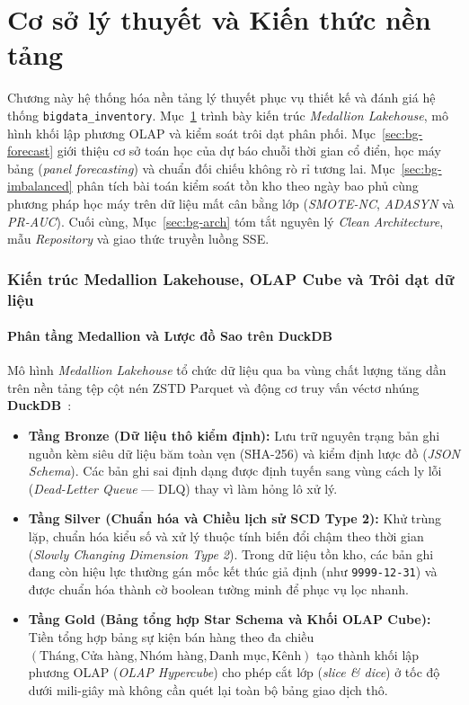 \part{Cơ sở lý thuyết và Kiến thức nền tảng}
\label{part:background}

Chương này hệ thống hóa nền tảng lý thuyết phục vụ thiết kế và đánh giá hệ thống \texttt{bigdata_inventory}. Mục~\ref{sec:bg-lakehouse} trình bày kiến trúc \textit{Medallion Lakehouse}, mô hình khối lập phương OLAP và kiểm soát trôi dạt phân phối. Mục~\ref{sec:bg-forecast} giới thiệu cơ sở toán học của dự báo chuỗi thời gian cổ điển, học máy bảng (\textit{panel forecasting}) và chuẩn đối chiếu không rò rỉ tương lai. Mục~\ref{sec:bg-imbalanced} phân tích bài toán kiểm soát tồn kho theo ngày bao phủ cùng phương pháp học máy trên dữ liệu mất cân bằng lớp (\textit{SMOTE-NC}, \textit{ADASYN} và \textit{PR-AUC}). Cuối cùng, Mục~\ref{sec:bg-arch} tóm tắt nguyên lý \textit{Clean Architecture}, mẫu \textit{Repository} và giao thức truyền luồng SSE.

\section{Kiến trúc Medallion Lakehouse, OLAP Cube và Trôi dạt dữ liệu}
\label{sec:bg-lakehouse}

\subsection{Phân tầng Medallion và Lược đồ Sao trên DuckDB}
Mô hình \textit{Medallion Lakehouse} tổ chức dữ liệu qua ba vùng chất lượng tăng dần trên nền tảng tệp cột nén ZSTD Parquet và động cơ truy vấn véctơ nhúng \textbf{DuckDB}~\cite{raasveldt2019duckdb}:
\begin{itemize}[topsep=0pt, itemsep=1pt]
	\item \textbf{Tầng Bronze (Dữ liệu thô kiểm định):} Lưu trữ nguyên trạng bản ghi nguồn kèm siêu dữ liệu băm toàn vẹn (SHA-256) và kiểm định lược đồ (\textit{JSON Schema}). Các bản ghi sai định dạng được định tuyến sang vùng cách ly lỗi (\textit{Dead-Letter Queue} --- DLQ) thay vì làm hỏng lô xử lý.
	\item \textbf{Tầng Silver (Chuẩn hóa và Chiều lịch sử SCD Type 2):} Khử trùng lặp, chuẩn hóa kiểu số và xử lý thuộc tính biến đổi chậm theo thời gian (\textit{Slowly Changing Dimension Type 2}). Trong dữ liệu tồn kho, các bản ghi đang còn hiệu lực thường gán mốc kết thúc giả định (như \texttt{9999-12-31}) và được chuẩn hóa thành cờ boolean tường minh để phục vụ lọc nhanh.
	\item \textbf{Tầng Gold (Bảng tổng hợp Star Schema và Khối OLAP Cube):} Tiền tổng hợp bảng sự kiện bán hàng theo đa chiều $(\text{Tháng}, \text{Cửa hàng}, \text{Nhóm hàng}, \text{Danh mục}, \text{Kênh})$ tạo thành khối lập phương OLAP (\textit{OLAP Hypercube}) cho phép cắt lớp (\textit{slice \& dice}) ở tốc độ dưới mili-giây mà không cần quét lại toàn bộ bảng giao dịch thô.
\end{itemize}

